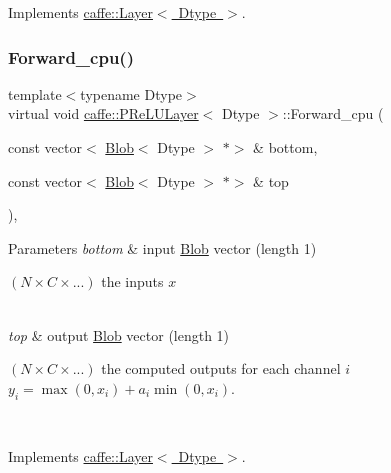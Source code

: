 Implements \mbox{\hyperlink{classcaffe_1_1_layer_a75c9b2a321dc713e0eaef530d02dc37f}{caffe\+::\+Layer$<$ Dtype $>$}}.

\mbox{\label{classcaffe_1_1_p_re_l_u_layer_a96c0dbe910e3700838d7e057bbac5206}} 
\subsubsection{\texorpdfstring{Forward\+\_\+cpu()}{Forward\_cpu()}\hspace{0.1cm}{\footnotesize\ttfamily [1/2]}}
{\footnotesize\ttfamily template$<$typename Dtype$>$ \\
virtual void \mbox{\hyperlink{classcaffe_1_1_p_re_l_u_layer}{caffe\+::\+P\+Re\+L\+U\+Layer}}$<$ Dtype $>$\+::Forward\+\_\+cpu (\begin{DoxyParamCaption}\item[{const vector$<$ \mbox{\hyperlink{classcaffe_1_1_blob}{Blob}}$<$ Dtype $>$ $\ast$$>$ \&}]{bottom,  }\item[{const vector$<$ \mbox{\hyperlink{classcaffe_1_1_blob}{Blob}}$<$ Dtype $>$ $\ast$$>$ \&}]{top }\end{DoxyParamCaption})\hspace{0.3cm}{\ttfamily [protected]}, {\ttfamily [virtual]}}


\begin{DoxyParams}{Parameters}
{\em bottom} & input \mbox{\hyperlink{classcaffe_1_1_blob}{Blob}} vector (length 1)
\begin{DoxyEnumerate}
\item $ (N \times C \times ...) $ the inputs $ x $ 
\end{DoxyEnumerate}\\
\hline
{\em top} & output \mbox{\hyperlink{classcaffe_1_1_blob}{Blob}} vector (length 1)
\begin{DoxyEnumerate}
\item $ (N \times C \times ...) $ the computed outputs for each channel $i$ $ y_i = \max(0, x_i) + a_i \min(0, x_i) $. 
\end{DoxyEnumerate}\\
\hline
\end{DoxyParams}


Implements \mbox{\hyperlink{classcaffe_1_1_layer_a576ac6a60b1e99fe383831f52a6cea77}{caffe\+::\+Layer$<$ Dtype $>$}}.

